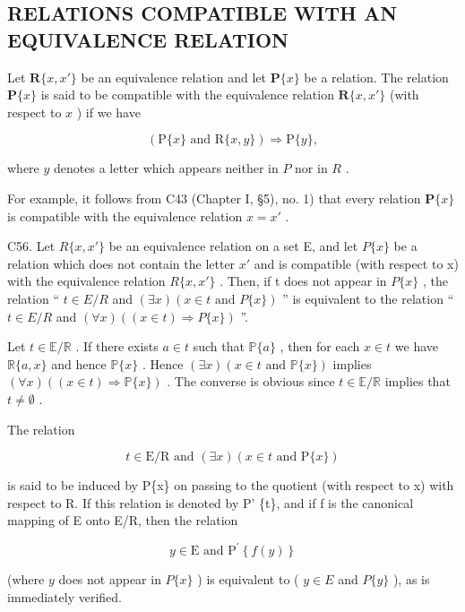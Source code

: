 \subsection{RELATIONS COMPATIBLE WITH AN EQUIVALENCE RELATION}

Let \(\mathbf{R}\{x, x'\}\) be an equivalence relation and let \(\mathbf{P}\{x\}\) be a relation. The relation \(\mathbf{P}\{x\}\) is said to be compatible with the equivalence relation \(\mathbf{R}\{x, x'\}\) (with respect to \(x\) ) if we have

\[
(\mathrm{P} \{x \} \text {   and   } \mathrm{R} \{x, y \}) \Longrightarrow \mathrm{P} \{y \},
\]

where \(y\) denotes a letter which appears neither in \(P\) nor in \(R\) .

For example, it follows from C43 (Chapter I, §5), no. 1) that every relation \(\mathbf{P}\{x\}\) is compatible with the equivalence relation \(x = x'\) .

C56. Let \(R\{x, x'\}\) be an equivalence relation on a set E, and let \(P\{x\}\) be a relation which does not contain the letter \(x'\) and is compatible (with respect to x) with the equivalence relation \(R\{x, x'\}\) . Then, if t does not appear in \(P\{x\}\) , the relation `` \(t \in E/R\) and \((\exists x)(x \in t \text{ and } P\{x\})\) '' is equivalent to the relation `` \(t \in E/R\) and \((\forall x)((x \in t) \Longrightarrow P\{x\})\) ''.

Let \(t \in \mathbb{E} / \mathbb{R}\) . If there exists \(a \in t\) such that \(\mathbb{P}\{a\}\) , then for each \(x \in t\) we have \(\mathbb{R}\{a, x\}\) and hence \(\mathbb{P}\{x\}\) . Hence \((\exists x)(x \in t \text{ and } \mathbb{P}\{x\})\) implies \((\forall x)((x \in t) \Longrightarrow \mathbb{P}\{x\})\) . The converse is obvious since \(t \in \mathbb{E} / \mathbb{R}\) implies that \(t \neq \emptyset\) .

The relation

\[
t \in \mathrm{E} / \mathrm{R} \text { and } (\exists x) (x \in t \text { and } \mathrm{P} \{x \})
\]

is said to be induced by P\{x\} on passing to the quotient (with respect to x) with respect to R. If this relation is denoted by P' \{t\}, and if f is the canonical mapping of E onto E/R, then the relation

\[
y \in \mathrm{E} \text {   and   } \mathrm{P} ^ {\prime} \left\{f (y) \right\}
\]

(where \(y\) does not appear in \(P\{x\}\) ) is equivalent to ( \(y \in E\) and \(P\{y\}\) ), as is immediately verified.

